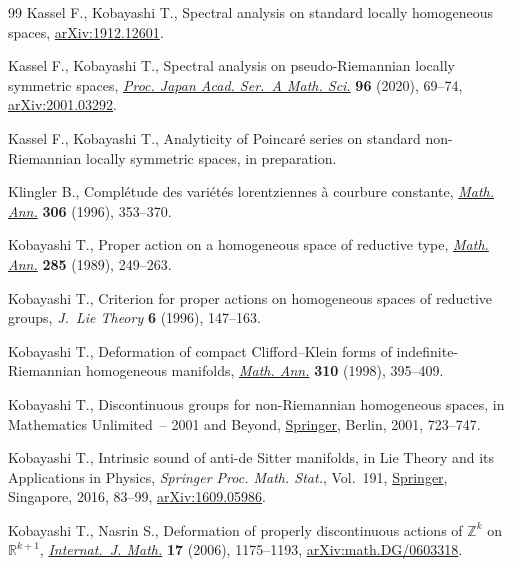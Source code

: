 \documentclass[pdftex]{sigma}
\numberwithin{equation}{section}
\begin{document}
\begin{thebibliography}{99}
Kassel F., Kobayashi T., Spectral analysis on standard locally homogeneous
 spaces, \href{https://arxiv.org/abs/1912.12601}{arXiv:1912.12601}.

Kassel F., Kobayashi T., Spectral analysis on pseudo-{R}iemannian locally
 symmetric spaces, \href{https://doi.org/10.3792/pjaa.96.013}{\textit{Proc. Japan Acad. Ser.~A Math. Sci.}} \textbf{96}
 (2020), 69--74, \href{https://arxiv.org/abs/2001.03292}{arXiv:2001.03292}.

Kassel F., Kobayashi T., Analyticity of {P}oincar\'e series on standard
 non-{R}iemannian locally symmetric spaces, in preparation.

Klingler B., Compl\'etude des vari\'et\'es lorentziennes \`a courbure
 constante, \href{https://doi.org/10.1007/BF01445255}{\textit{Math. Ann.}} \textbf{306} (1996), 353--370.

Kobayashi T., Proper action on a homogeneous space of reductive type,
 \href{https://doi.org/10.1007/BF01443517}{\textit{Math. Ann.}} \textbf{285} (1989), 249--263.

Kobayashi T., Criterion for proper actions on homogeneous spaces of reductive
 groups, \textit{J.~Lie Theory} \textbf{6} (1996), 147--163.

Kobayashi T., Deformation of compact {C}lifford--{K}lein forms of
 indefinite-{R}iemannian homogeneous manifolds, \href{https://doi.org/10.1007/s002080050153}{\textit{Math. Ann.}}
 \textbf{310} (1998), 395--409.

Kobayashi T., Discontinuous groups for non-{R}iemannian homogeneous spaces, in
 Mathematics Unlimited~-- 2001 and Beyond, \href{https://doi.org/10.1007/978-3-642-56478-9_37}{Springer}, Berlin, 2001, 723--747.

Kobayashi T., Intrinsic sound of anti-de {S}itter manifolds, in Lie Theory and
 its Applications in Physics, \textit{Springer Proc. Math. Stat.}, Vol.~191,
 \href{https://doi.org/10.1007/978-981-10-2636-2_6}{Springer}, Singapore, 2016, 83--99, \href{https://arxiv.org/abs/1609.05986}{arXiv:1609.05986}.

Kobayashi T., Nasrin S., Deformation of properly discontinuous actions of
 {${\mathbb Z}^k$} on {${\mathbb R}^{k+1}$}, \href{https://doi.org/10.1142/S0129167X06003862}{\textit{Internat.~J. Math.}}
 \textbf{17} (2006), 1175--1193, \href{https://arxiv.org/abs/math.DG/0603318}{arXiv:math.DG/0603318}.


\end{thebibliography}
\end{document}
